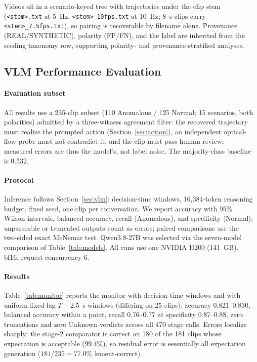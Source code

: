 \documentclass[conference]{IEEEtran}
\begin{document}
Videos sit in a scenario-keyed tree with trajectories under the clip stem (\texttt{<stem>.txt} at 5~Hz, \texttt{<stem>\_10fps.txt} at 10~Hz; 8~s clips carry \texttt{<stem>\_7.5fps.txt}), so pairing is recoverable by filename alone. Provenance (REAL/SYNTHETIC), polarity (FP/FN), and the label are inherited from the seeding taxonomy row, supporting polarity- and provenance-stratified analyses.

\subsection{VLM Performance Evaluation}\label{sec:eval}

\paragraph{Evaluation subset} All results use a 235-clip subset (110 Anomalous / 125 Normal; 15 scenarios, both polarities) admitted by a three-witness agreement filter: the recovered trajectory must realize the prompted action (Section~\ref{sec:action}), an independent optical-flow probe must not contradict it, and the clip must pass human review; measured errors are thus the model's, not label noise. The majority-class baseline is 0.532.

\paragraph{Protocol} Inference follows Section~\ref{sec:vlm}: decision-time windows, 16{,}384-token reasoning budget, fixed seed, one clip per conversation. We report accuracy with 95\% Wilson intervals, balanced accuracy, recall (Anomalous), and specificity (Normal); unparseable or truncated outputs count as errors; paired comparisons use the two-sided exact McNemar test. Qwen3.8-27B was selected via the seven-model comparison of Table~\ref{tab:models}. All runs use one NVIDIA H200 (141~GB), bf16, request concurrency 6.

\paragraph{Results} Table~\ref{tab:monitor} reports the monitor with decision-time windows and with uniform fixed-lag $T-2.5$~s windows (differing on 25 clips): accuracy 0.821--0.830, balanced accuracy within a point, recall 0.76--0.77 at specificity 0.87--0.88, zero truncations and zero Unknown verdicts across all 470 stage calls. Errors localize sharply: the stage-2 comparator is correct on 180 of the 181 clips whose expectation is acceptable (99.4\%), so residual error is essentially all expectation generation ($181/235 = 77.0\%$ lenient-correct).
\end{document}
